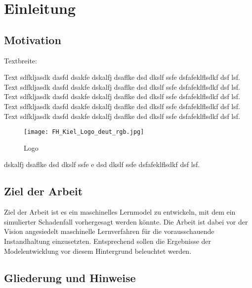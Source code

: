 \chapter{Einleitung}
\label{ch:einleitung}

\section{Motivation}
\label{sec:motivation}
Textbreite:\the\textwidth

Text sdfkljasdk dasfd dsakfe dskalfj dsaflke dsd dkslf ssfe dsfafeklflsdkf dsf lsf. Text sdfkljasdk dasfd dsakfe dskalfj dsaflke dsd dkslf ssfe dsfafeklflsdkf dsf lsf. Text sdfkljasdk dasfd dsakfe dskalfj dsaflke dsd dkslf ssfe dsfafeklflsdkf dsf lsf. Text sdfkljasdk dasfd dsakfe dskalfj dsaflke dsd dkslf ssfe dsfafeklflsdkf dsf lsf. Text sdfkljasdk dasfd dsakfe dskalfj dsaflke dsd dkslf ssfe dsfafeklflsdkf dsf lsf.

\begin{figure}[ht]
	\centering
	\texttt{[image: FH\_Kiel\_Logo\_deut\_rgb.jpg]}
	\caption{Logo}
	\label{fig:fhlogo}
\end{figure}

dskalfj dsaflke dsd dkslf ssfe e dsd dkslf ssfe dsfafeklflsdkf dsf lsf. \cite{gasparovic1969}
\section{Ziel der Arbeit}
\label{sec:ziel}
Ziel der Arbeit ist es ein maschinelles Lernmodel zu entwickeln, mit dem ein simulierter Schadenfall vorhergesagt werden könnte. Die Arbeit ist dabei vor der Vision angesiedelt maschinelle Lernverfahren für die vorausschauende Instandhaltung einzusetzten. Entsprechend sollen die Ergebnisse der Modelentwicklung vor diesem Hintergrund beleuchtet werden.

\section{Gliederung und Hinweise}
\label{sec:gliederung}

\blindtext[2]

\blindtext[3]

\blindtext[5]

\blindtext[3]